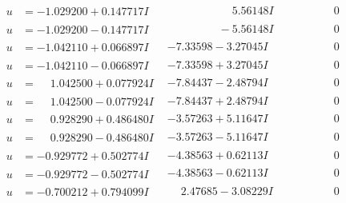 \documentclass[1p]{elsarticle_modified}
\theoremstyle{definition}
\begin{document}
$$\begin{array}{c|c|c}
\begin{aligned}
u &= -1.029200 + 0.147717 I\end{aligned}
 & \phantom{-0.000000 -}5.56148 I & \phantom{-0.000000 } 0 \\ \hline\begin{aligned}
u &= -1.029200 - 0.147717 I\end{aligned}
 & \phantom{-0.000000 } -5.56148 I & \phantom{-0.000000 } 0 \\ \hline\begin{aligned}
u &= -1.042110 + 0.066897 I\end{aligned}
 & -7.33598 - 3.27045 I & \phantom{-0.000000 } 0 \\ \hline\begin{aligned}
u &= -1.042110 - 0.066897 I\end{aligned}
 & -7.33598 + 3.27045 I & \phantom{-0.000000 } 0 \\ \hline\begin{aligned}
u &= \phantom{-}1.042500 + 0.077924 I\end{aligned}
 & -7.84437 - 2.48794 I & \phantom{-0.000000 } 0 \\ \hline\begin{aligned}
u &= \phantom{-}1.042500 - 0.077924 I\end{aligned}
 & -7.84437 + 2.48794 I & \phantom{-0.000000 } 0 \\ \hline\begin{aligned}
u &= \phantom{-}0.928290 + 0.486480 I\end{aligned}
 & -3.57263 + 5.11647 I & \phantom{-0.000000 } 0 \\ \hline\begin{aligned}
u &= \phantom{-}0.928290 - 0.486480 I\end{aligned}
 & -3.57263 - 5.11647 I & \phantom{-0.000000 } 0 \\ \hline\begin{aligned}
u &= -0.929772 + 0.502774 I\end{aligned}
 & -4.38563 + 0.62113 I & \phantom{-0.000000 } 0 \\ \hline\begin{aligned}
u &= -0.929772 - 0.502774 I\end{aligned}
 & -4.38563 - 0.62113 I & \phantom{-0.000000 } 0 \\ \hline\begin{aligned}
u &= -0.700212 + 0.794099 I\end{aligned}
 & \phantom{-}2.47685 - 3.08229 I & \phantom{-0.000000 } 0 \\ \hline\begin{aligned}

\end{aligned}
\end{array}$$
\end{document}

